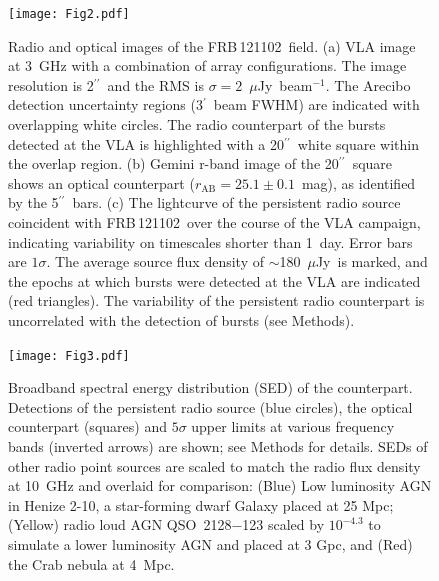 \documentclass{nature_frb}
\newcommand{\frb}{FRB\,121102}
\newcommand{\uJy}{$\mu$Jy}
\newcommand{\arcsec}{\ensuremath{^{\prime\prime}}}
\newcommand{\arcmin}{\ensuremath{^{\prime}}}
\begin{document}
\begin{figure}
\begin{center}
\texttt{[image: Fig2.pdf]}
\end{center}
\caption{Radio and optical images of the \frb\ field.
(a) VLA image at 3~GHz with a combination of array configurations. The image resolution is 2\arcsec\ and the RMS is $\sigma = 2$~\uJy~beam$^{-1}$. The Arecibo detection\cite{ssh+16a} uncertainty regions (3\arcmin\ beam FWHM) are indicated with overlapping white circles. The radio counterpart of the bursts detected at the VLA is highlighted with a 20\arcsec\ white square within the overlap region. (b) Gemini r-band image of the 20\arcsec\ square shows an optical counterpart
($r_\mathrm{AB}=25.1\pm0.1$~mag), as identified by the 5\arcsec\ bars.
(c) The lightcurve of the persistent radio source coincident with \frb\ over the course of the VLA campaign, indicating variability on timescales shorter than 1~day. Error bars are $1\sigma$. The average source flux density of $\sim$180~\uJy\ is marked, and the epochs at which bursts were detected at the VLA are indicated (red triangles). The variability of the persistent radio counterpart is uncorrelated with the detection of bursts (see Methods).}
\label{fig:field}
\end{figure}

\clearpage


\begin{figure}
\begin{center}
\texttt{[image: Fig3.pdf]}
\end{center}
\caption{Broadband spectral energy distribution (SED) of the counterpart.
Detections of the persistent radio source (blue circles), the optical counterpart (squares) and $5\sigma$ upper limits at various frequency bands (inverted arrows) are shown; see Methods for details.
SEDs of other radio point sources are scaled to match the radio flux density at 10~GHz and overlaid for comparison: (Blue) Low luminosity AGN in Henize 2-10, a star-forming dwarf Galaxy\cite{rd2012} placed at 25 Mpc; (Yellow) radio loud AGN QSO~2128$-$123\cite{ewm+1994} scaled by $10^{-4.3}$ to simulate a lower luminosity AGN and placed at 3 Gpc, and (Red) the Crab nebula\cite{bb2014} at 4~Mpc.
\label{fig:sed}}
\end{figure}

\clearpage

\end{document}
